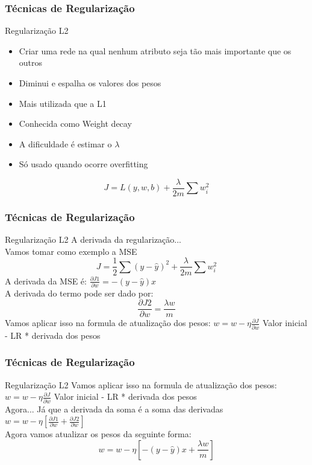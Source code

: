 \documentclass{beamer}
\begin{document}
\begin{frame}
	\frametitle{Técnicas de Regularização}
	\begin{block}{Regularização L2}
		\begin{itemize}
			\item Criar uma rede na qual nenhum atributo seja tão mais importante que os outros
			\item Diminui e espalha os valores dos pesos
			\item Mais utilizada que a L1
			\item Conhecida como Weight decay
			\item A dificuldade é estimar o $\lambda$
			\item Só usado quando ocorre overfitting
		\end{itemize}
		$$J = L(y, w, b) + \frac{\lambda}{2m} \sum w_i^2$$
	\end{block}
\end{frame}
\begin{frame}
	\frametitle{Técnicas de Regularização}
	\begin{block}{Regularização L2}
		A derivada da regularização... \\
		Vamos tomar como exemplo a MSE
		$$J = \frac{1}{2} \sum (y - \hat{y})^2 + \frac{\lambda}{2m} \sum w_i^2$$
		A derivada da MSE é:
		$\frac{\partial J1}{\partial w} = -(y - \hat{y})x$ \\
		A derivada do termo pode ser dado por:
		$$\frac{\partial J2}{\partial w} =  \frac{\lambda w}{m}$$
		Vamos aplicar isso na formula de atualização dos pesos:
		$w = w - \eta \frac{\partial J}{\partial w}$ Valor inicial - LR * derivada dos pesos 
	\end{block}
\end{frame}
\begin{frame}
	\frametitle{Técnicas de Regularização}
	\begin{block}{Regularização L2}
		Vamos aplicar isso na formula de atualização dos pesos:
		$w = w - \eta \frac{\partial J}{\partial w}$ Valor inicial - LR * derivada dos pesos \\
		Agora... Já que a derivada da soma é a soma das derivadas \\
		$w = w - \eta [\frac{\partial J1}{\partial w} + \frac{\partial J2}{\partial w}]$ \\
		Agora vamos atualizar os pesos da seguinte forma:
		$$w =  w - \eta [-(y-\hat{y})x + \frac{\lambda w}{m}]$$
	\end{block}
\end{frame}
\end{document}
